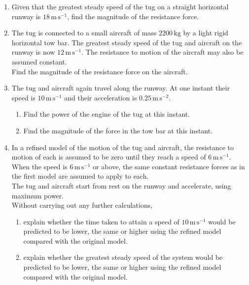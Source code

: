 \documentclass[leqno]{article}
\begin{document}
\begin{enumerate}[
  label=\textbf{\arabic*.},
  leftmargin=*,
  topsep=0pt,
  partopsep=0pt,
  parsep=0pt
]
\begin{enumerate}[label=\textbf{(\roman*)}]
  \item Given that the greatest steady speed of the tug on a straight horizontal runway is $18\,\mathrm{m\,s^{-1}}$, find the magnitude of the resistance force.  \\
  \item The tug is connected to a small aircraft of mass $2200\,\mathrm{kg}$ by a light rigid horizontal tow bar. The greatest steady speed of the tug and aircraft on the runway is now $12\,\mathrm{m\,s^{-1}}$. The resistance to motion of the aircraft may also be assumed constant. \\

  Find the magnitude of the resistance force on the aircraft.  \\
  \item The tug and aircraft again travel along the runway. At one instant their speed is $10\,\mathrm{m\,s^{-1}}$ and their acceleration is $0.25\,\mathrm{m\,s^{-2}}$. \\

  \begin{enumerate}[label=(\alph*)]
    \item Find the power of the engine of the tug at this instant. 
    \item Find the magnitude of the force in the tow bar at this instant. \\
  \end{enumerate}
  \item In a refined model of the motion of the tug and aircraft, the resistance to motion of each is assumed to be zero until they reach a speed of $6\,\mathrm{m\,s^{-1}}$. When the speed is $6\,\mathrm{m\,s^{-1}}$ or above, the same constant resistance forces as in the first model are assumed to apply to each. \\

  The tug and aircraft start from rest on the runway and accelerate, using maximum power. \\

  Without carrying out any further calculations,
  \begin{enumerate}[label=(\alph*)]
    \item explain whether the time taken to attain a speed of $10\,\mathrm{m\,s^{-1}}$ would be predicted to be lower, the same or higher using the refined model compared with the original model. 
    \item explain whether the greatest steady speed of the system would be predicted to be lower, the same or higher using the refined model compared with the original model. 
  \end{enumerate}
\end{enumerate}


\end{enumerate}
\end{document}
